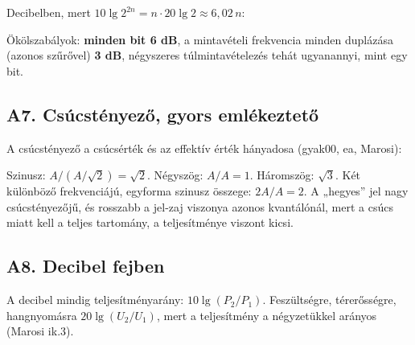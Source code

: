 Decibelben, mert $10\lg 2^{2n}=n\cdot 20\lg 2\approx 6{,}02\,n$:

\begin{center}\end{center}

\par{}\par

Ökölszabályok: \textbf{minden bit 6 dB}, a mintavételi frekvencia minden duplázása (azonos szűrővel) \textbf{3 dB}, négyszeres túlmintavételezés tehát ugyanannyi, mint egy bit.

\subsection{\texorpdfstring{A7. Csúcstényező, gyors emlékeztető}{A7. Csúcstényező, gyors emlékeztető}}\label{a2-csucstenyezo}
A csúcstényező a csúcsérték és az effektív érték hányadosa (gyak00, ea, Marosi):

\begin{center}\end{center}

Szinusz: $A/(A/\sqrt2)=\sqrt2$. Négyszög: $A/A=1$. Háromszög: $\sqrt3$. Két különböző frekvenciájú, egyforma szinusz összege: $2A/A=2$. A „hegyes” jel nagy csúcstényezőjű, és rosszabb a jel-zaj viszonya azonos kvantálónál, mert a csúcs miatt kell a teljes tartomány, a teljesítménye viszont kicsi.

\subsection{\texorpdfstring{A8. Decibel fejben}{A8. Decibel fejben}}\label{a2-decibel}
A decibel mindig teljesítményarány: $10\lg(P_2/P_1)$. Feszültségre, térerősségre, hangnyomásra $20\lg(U_2/U_1)$, mert a teljesítmény a négyzetükkel arányos (Marosi ik.3).


